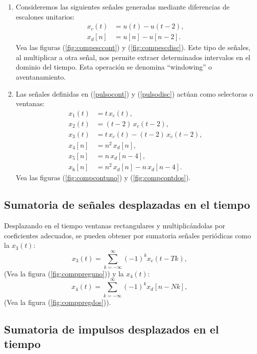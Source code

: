 \documentclass[11pt,a4paper,openany]{book}
\begin{document}
\begin{enumerate}
	\item Consideremos las siguientes señales generadas mediante
	diferencias de escalones unitarios:
	\begin{align}
		x_{c}(t) &= u(t) - u(t-2), \label{pulsocont} \\
		x_{d}[n] &= u[n] - u[n-2]. \label{pulsodisc}
	\end{align}
	Vea las figuras (\ref{fig:compesccont}) y (\ref{fig:compescdisc}).
	Este tipo de señales, al multiplicar a otra señal, nos permite
	extraer determinados intervalos en el dominio del tiempo. Esta
	operación se denomina ``windowing'' o aventanamiento.
	
	\item Las señales definidas en (\ref{pulsocont}) y
	(\ref{pulsodisc}) actúan como selectoras o ventanas:
	\begin{align}
		x_{1}(t) &= t \, x_{c}(t), \\
		x_{2}(t) &= (t - 2) \, x_{c}(t - 2), \\
		x_{3}(t) &= t \, x_{c}(t) - (t - 2) \, x_{c}(t - 2), \\
		x_{4}[n] &= n^{2} \, x_{d}[n], \\
		x_{5}[n] &= n \, x_{d}[n-4], \\ 
		x_{6}[n] &= n^{2} \, x_{d}[n] - n \, x_{d}[n-4].
	\end{align}
	Vea las figuras (\ref{fig:compcontuno}) y (\ref{fig:compcontdos}). 
\end{enumerate}

\subsection{Sumatoria de señales desplazadas en el tiempo}

Desplazando en el tiempo ventanas rectangulares y
multiplicándolas por coeficientes adecuados, 
se pueden obtener por sumatoria señales periódicas como la $x_{3}(t)$:
\begin{equation}
	x_{3}(t) = \sum_{k=-\infty}^{\infty} (-1)^k x_{c}(t- T k),
\end{equation}
(Vea la figura (\ref{fig:comppreguno})) y la $x_{4}(t)$:
\begin{equation}
	x_{4}(t) = \sum_{k=-\infty}^{\infty} (-1)^k x_{d}[n- N k], 
\end{equation}
(Vea la figura (\ref{fig:comppregdos})).

\subsection{Sumatoria de impulsos desplazados en el tiempo}
\end{document}
